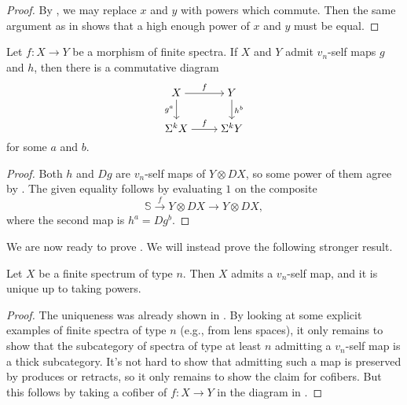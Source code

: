 \documentclass[../notes.tex]{subfiles}
\begin{document}
\begin{proof}
	By , we may replace $x$ and $y$ with powers which commute. Then the same argument as in  shows that a high enough power of $x$ and $y$ must be equal.
\end{proof}
\begin{corollary} \label{cor:vn-powers-functorial}
	Let $f\colon X\to Y$ be a morphism of finite spectra. If $X$ and $Y$ admit $v_n$-self maps $g$ and $h$, then there is a commutative diagram
	\[\begin{tikzcd}[cramped]
		X & Y \\
		{\Sigma^kX} & {\Sigma^kY}
		\arrow["f", from=1-1, to=1-2]
		\arrow["{g^a}"', from=1-1, to=2-1]
		\arrow["{h^b}", from=1-2, to=2-2]
		\arrow["f", from=2-1, to=2-2]
	\end{tikzcd}\]
	for some $a$ and $b$.
\end{corollary}
\begin{proof}
	Both $h$ and $Dg$ are $v_n$-self maps of $Y\otimes DX$, so some power of them agree by . The given equality follows by evaluating $1$ on the composite
	\[\mathbb S\stackrel f\to Y\otimes DX\to Y\otimes DX,\]
	where the second map is $h^a=Dg^b$.
\end{proof}
We are now ready to prove . We will instead prove the following stronger result.
\begin{theorem}
	Let $X$ be a finite spectrum of type $n$. Then $X$ admits a $v_n$-self map, and it is unique up to taking powers.
\end{theorem}
\begin{proof}
	The uniqueness was already shown in . By looking at some explicit examples of finite spectra of type $n$ (e.g., from lens spaces), it only remains to show that the subcategory of spectra of type at least $n$ admitting a $v_n$-self map is a thick subcategory. It's not hard to show that admitting such a map is preserved by produces or retracts, so it only remains to show the claim for cofibers. But this follows by taking a cofiber of $f\colon X\to Y$ in the diagram in .
\end{proof}
\end{document}
